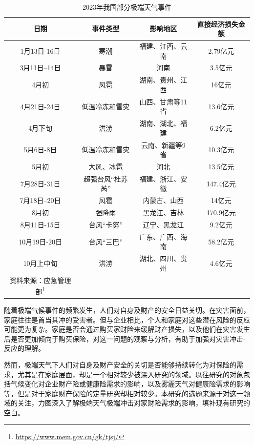 \begin{longtable}{cccc}
    \caption{2023年我国部分极端天气事件}\label{tab:weather}\\
        \toprule
        \textbf{日期} & \textbf{事件类型} & \textbf{影响地区}&\textbf{直接经济损失金额} \\
        \midrule
        1月13日-16日   & 寒潮        & 福建、江西、云南          &2.79亿元  \\
        3月11日–14日   & 暴雪        & 河南          &3.5亿元  \\
        4月初   & 风雹        & 湖南、贵州、江西          &16亿元  \\
        4月21日-24日   & 低温冷冻和雪灾        & 山西、甘肃等11省          &13.6亿元  \\
        4月下旬   & 洪涝        & 湖南、湖北、福建          &6.2亿元  \\
        5月6日-8日   & 低温冷冻和雪灾        & 云南、新疆等9省          &10.3亿元  \\
        5月初   & 大风、冰雹        & 河北          &13.5亿元  \\
    7月28日-31日   & 超强台风“杜苏芮”        & 福建、浙江、安徽          &147.4亿元  \\
    7月18日–20日   & 风雹        & 内蒙古、山西          &14亿元  \\
        8月初   & 强降雨        & 黑龙江、吉林          &170.9亿元  \\
        8月11日-15日   &台风“卡努”        & 辽宁、黑龙江          &9.2亿元  \\
        10月19日-20日   & 台风“三巴”        & 广东、广西、海南          &58.2亿元  \\
        10月上中旬   & 洪涝        & 湖北、四川、贵州          &4.6亿元  \\
        \bottomrule
    资料来源：应急管理部\footnote{\url{https://www.mem.gov.cn/gk/tjsj/}}
\end{longtable}

随着极端气候事件的频繁发生，人们对自身及财产的安全日益关切。在灾害面前，家庭往往是首当其冲的受害者。但与企业相比，个人和家庭对这些潜在风险的反应可能更为复杂。家庭是否会通过购买家财险来缓解财产损失，以及他们在灾害发生后是否更加倾向于购买保险，对这一问题的观察与分析，有助于加强对灾害冲击-反应的理解。

然而，极端天气下人们对自身及财产安全的关切是否能够持续转化为对保险的需求，尤其是在家庭层面，却是一个相对较少被深入研究的领域。以往研究的对象包括气候变化对企业财产险\citep{杨娜娜2019自然灾害与企业现金持有}或健康险\citep{赵强2021空气污染对商业健康保险需求的影响}需求的影响，以及雾霾天气对健康险需求的影响\citep{2018Something}等，但是对于家庭财产保险的定量研究却相对较少。本研究的选题来源于对这一领域的关注，力图深入了解极端天气极端冲击对家财险需求的影响，填补现有研究的空白。

